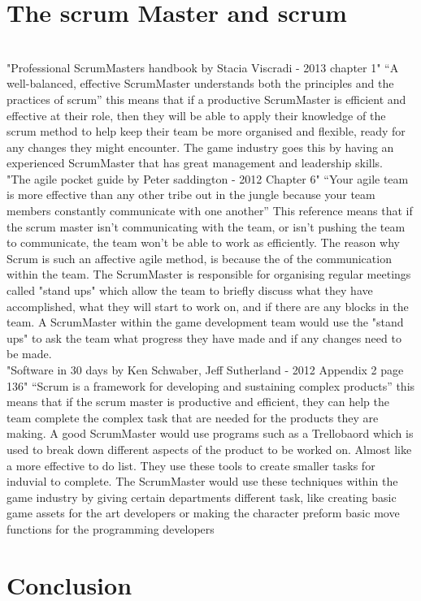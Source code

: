 \documentclass{scrartcl}
\begin{document}
\section {The scrum Master and scrum}\\  
"Professional ScrumMasters handbook by Stacia Viscradi - 2013 chapter 1" “A well-balanced, effective ScrumMaster understands both the principles and the practices of scrum” this means that if a productive ScrumMaster is efficient and effective at their role, then they will be able to apply their knowledge of the scrum method to help keep their team be more organised and flexible, ready for any changes they might encounter. The game industry goes this by having an experienced ScrumMaster that has great management and leadership skills.\\  
"The agile pocket guide by Peter saddington - 2012 Chapter 6" “Your agile team is more effective than any other tribe out in the jungle because your team members constantly communicate with one another” This reference means that if the scrum master isn't communicating with the team, or isn't pushing the team to communicate, the team won't be able to work as efficiently. The reason why Scrum is such an affective agile method, is because the of the communication within the team. The ScrumMaster is responsible for organising regular meetings called "stand ups" which allow the team to briefly discuss what they have accomplished, what they will start to work on, and if there are any blocks in the team. A ScrumMaster within the game development team would use the "stand ups" to ask the team what progress they have made and if any changes need to be made.\\   
"Software in 30 days by Ken Schwaber, Jeff Sutherland - 2012 Appendix 2 page 136" “Scrum is a framework for developing and sustaining complex products” this means that if the scrum master is productive and efficient, they can help the team complete the complex task that are needed for the products they are making. A good ScrumMaster would use programs such as a Trellobaord which is used to break down different aspects of the product to be worked on. Almost like a more effective to do list. They use these tools to create smaller tasks for induvial to complete. The ScrumMaster would use these techniques within the game industry by giving certain departments different task, like creating basic game assets for the art developers or making the character preform basic move functions for the programming developers\\
\section{Conclusion}
\end{document}
